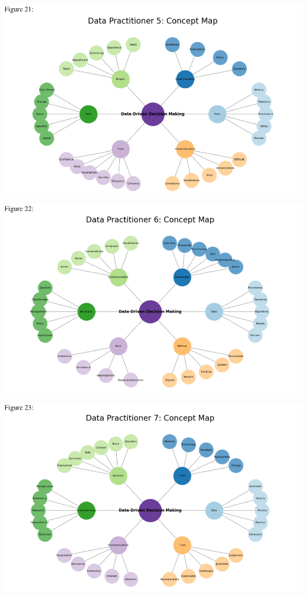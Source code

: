 \documentclass{article}
\begin{document}
\includegraphics{210431461_CSC8639_Dissertation_files/figure-latex/unnamed-chunk-17-1.pdf}

\includegraphics{210431461_CSC8639_Dissertation_files/figure-latex/unnamed-chunk-18-1.pdf}

\includegraphics{210431461_CSC8639_Dissertation_files/figure-latex/unnamed-chunk-19-1.pdf}
\end{document}
